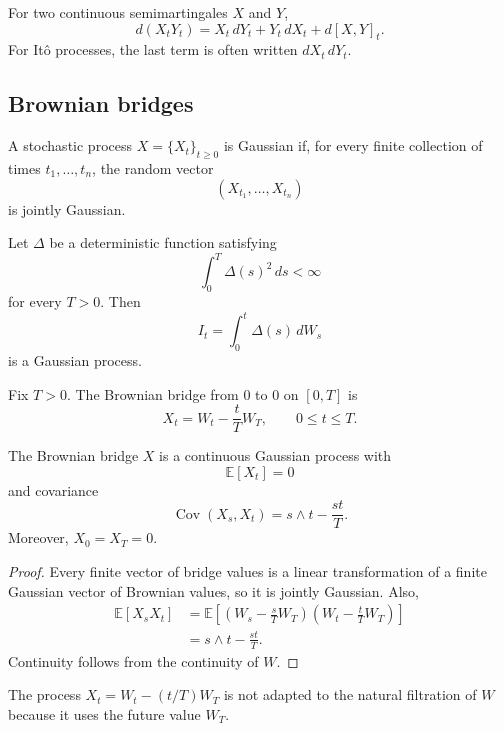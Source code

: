 \begin{thm}
For two continuous semimartingales $X$ and $Y$,
\[
d(X_tY_t)
=X_t\,dY_t+Y_t\,dX_t+d[X,Y]_t.
\]
For It\^o processes, the last term is often written $dX_t\,dY_t$.
\end{thm}

\subsection{Brownian bridges}

\begin{de}
A stochastic process $X=\{X_t\}_{t\geq 0}$ is Gaussian if, for every finite collection of times $t_1,\ldots,t_n$, the random vector
\[
(X_{t_1},\ldots,X_{t_n})
\]
is jointly Gaussian.
\end{de}

\begin{eg}
Let $\Delta$ be a deterministic function satisfying
\[
\int_0^T\Delta(s)^2\,ds<\infty
\]
for every $T>0$. Then
\[
I_t=\int_0^t\Delta(s)\,dW_s
\]
is a Gaussian process.
\end{eg}

\begin{de}
Fix $T>0$. The Brownian bridge from $0$ to $0$ on $[0,T]$ is
\[
X_t=W_t-\frac{t}{T}W_T,
\qquad 0\leq t\leq T.
\]
\end{de}

\begin{thm}
The Brownian bridge $X$ is a continuous Gaussian process with
\[
\mathbb{E}[X_t]=0
\]
and covariance
\[
\operatorname{Cov}(X_s,X_t)
=s\wedge t-\frac{st}{T}.
\]
Moreover, $X_0=X_T=0$.
\end{thm}

\begin{proof}
Every finite vector of bridge values is a linear transformation of a finite Gaussian vector of Brownian values, so it is jointly Gaussian. Also,
\[
\begin{aligned}
\mathbb{E}[X_sX_t]
&=
\mathbb{E}\left[
\left(W_s-\frac{s}{T}W_T\right)
\left(W_t-\frac{t}{T}W_T\right)
\right]\\
&=s\wedge t-\frac{st}{T}.
\end{aligned}
\]
Continuity follows from the continuity of $W$.
\end{proof}

\begin{remark}
The process $X_t=W_t-(t/T)W_T$ is not adapted to the natural filtration of $W$ because it uses the future value $W_T$.
\end{remark}


